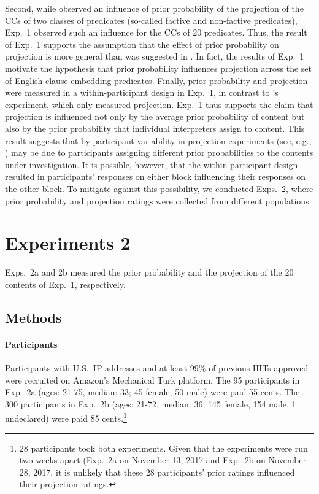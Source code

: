 \documentclass[11pt,fleqn]{article}
\newcommand{\6}{\mbox{$[\hspace*{-.6mm}[$}}
\newcommand{\9}{\mbox{$]\hspace*{-.6mm}]$}}
\newcommand{\citeposs}[1]{\citeauthor{#1}'s}
\begin{document}
Second, while \citealt{mahler2020} observed an influence of prior probability of the projection of the CCs of two classes of predicates (so-called factive and non-factive predicates), Exp.~1 observed such an influence for the CCs of 20 predicates. Thus, the result of Exp.~1 supports the assumption that the effect of prior probability on projection is more general than was suggested in \citealt{mahler2020}. In fact, the results of Exp.~1 motivate the hypothesis that prior probability influences projection across the set of English clause-embedding predicates. Finally, prior probability and projection were measured in a within-participant design in Exp.~1, in contrast to \citeposs{mahler2020} experiment, which only measured projection.  Exp.~1 thus supports the claim that projection is influenced not only by the average prior probability of content but also by the prior probability that individual interpreters assign to content. This result suggests that by-participant variability in projection experiments (see, e.g., \citealt{tbd-variability,tonhauser-degen-factive}) may be due to participants assigning different prior probabilities to the contents under investigation. It is possible, however, that the within-participant design resulted in participants' responses on either block influencing their responses on the other block. To mitigate against this possibility, we conducted Exps.~2, where prior probability and projection ratings were collected from different populations.  

\section{Experiments 2}\label{s3}

Exps.~2a and 2b measured the prior probability and the projection of the 20 contents of Exp.~1, respectively.

\subsection{Methods}


\paragraph{Participants} Participants with U.S.\ IP addresses and at least 99\% of previous HITs approved were recruited on Amazon's Mechanical Turk platform. The 95 participants in Exp.~2a (ages: 21-75, median: 33; 45 female, 50 male) were paid 55 cents. The 300 participants in Exp.~2b (ages: 21-72, median: 36; 145 female, 154 male, 1 undeclared) were paid 85 cents.\footnote{28 participants took both experiments. Given that the experiments were run two weeks apart (Exp.~2a on November 13, 2017 and Exp.~2b on November 28, 2017, it is unlikely that these 28 participants' prior ratings influenced their projection ratings.}
\end{document}
